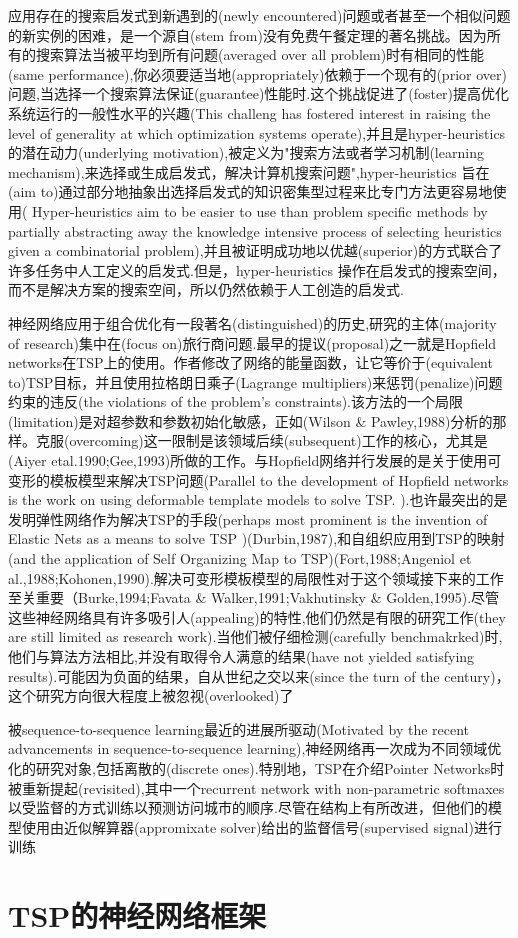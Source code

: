 \documentclass[a4paper,UTF8]{ctexart}
\theoremstyle{definition}
\begin{document}
应用存在的搜索启发式到新遇到的(newly encountered)问题或者甚至一个相似问题的新实例的困难，是一个源自(stem from)没有免费午餐定理的著名挑战。因为所有的搜索算法当被平均到所有问题(averaged over all problem)时有相同的性能(same performance),你必须要适当地(appropriately)依赖于一个现有的(prior over)问题,当选择一个搜索算法保证(guarantee)性能时.这个挑战促进了(foster)提高优化系统运行的一般性水平的兴趣(This challeng has fostered interest in raising the level of generality at which optimization systems operate),并且是hyper-heuristics的潜在动力(underlying motivation),被定义为"搜索方法或者学习机制(learning mechanism),来选择或生成启发式，解决计算机搜索问题",hyper-heuristics 旨在(aim to)通过部分地抽象出选择启发式的知识密集型过程来比专门方法更容易地使用( Hyper-heuristics aim to be easier to use than problem specific methods by partially abstracting away the knowledge intensive process of selecting heuristics given a combinatorial problem),并且被证明成功地以优越(superior)的方式联合了许多任务中人工定义的启发式.但是，hyper-heuristics 操作在启发式的搜索空间，而不是解决方案的搜索空间，所以仍然依赖于人工创造的启发式.

神经网络应用于组合优化有一段著名(distinguished)的历史,研究的主体(majority of research)集中在(focus on)旅行商问题.最早的提议(proposal)之一就是Hopfield networks在TSP上的使用。作者修改了网络的能量函数，让它等价于(equivalent to)TSP目标，并且使用拉格朗日乘子(Lagrange multipliers)来惩罚(penalize)问题约束的违反(the violations of the problem's constraints).该方法的一个局限(limitation)是对超参数和参数初始化敏感，正如(Wilson \& Pawley,1988)分析的那样。克服(overcoming)这一限制是该领域后续(subsequent)工作的核心，尤其是(Aiyer etal.1990;Gee,1993)所做的工作。与Hopfield网络并行发展的是关于使用可变形的模板模型来解决TSP问题(Parallel to the development of Hopfield networks is the work on using deformable template models to solve TSP. ).也许最突出的是发明弹性网络作为解决TSP的手段(perhaps most prominent is the invention of Elastic Nets as a means to solve TSP )(Durbin,1987),和自组织应用到TSP的映射(and the application of Self Organizing Map to TSP)(Fort,1988;Angeniol et al.,1988;Kohonen,1990).解决可变形模板模型的局限性对于这个领域接下来的工作至关重要（Burke,1994;Favata \& Walker,1991;Vakhutinsky \& Golden,1995).尽管这些神经网络具有许多吸引人(appealing)的特性,他们仍然是有限的研究工作(they are still limited as research work).当他们被仔细检测(carefully benchmakrked)时,他们与算法方法相比,并没有取得令人满意的结果(have not yielded satisfying results).可能因为负面的结果，自从世纪之交以来(since the turn of the century)，这个研究方向很大程度上被忽视(overlooked)了

被sequence-to-sequence learning最近的进展所驱动(Motivated by the recent advancements in sequence-to-sequence learning),神经网络再一次成为不同领域优化的研究对象,包括离散的(discrete ones).特别地，TSP在介绍Pointer Networks时被重新提起(revisited),其中一个recurrent network with non-parametric
softmaxes 以受监督的方式训练以预测访问城市的顺序.尽管在结构上有所改进，但他们的模型使用由近似解算器(appromixate solver)给出的监督信号(supervised signal)进行训练

\section{TSP的神经网络框架}
\end{document}
